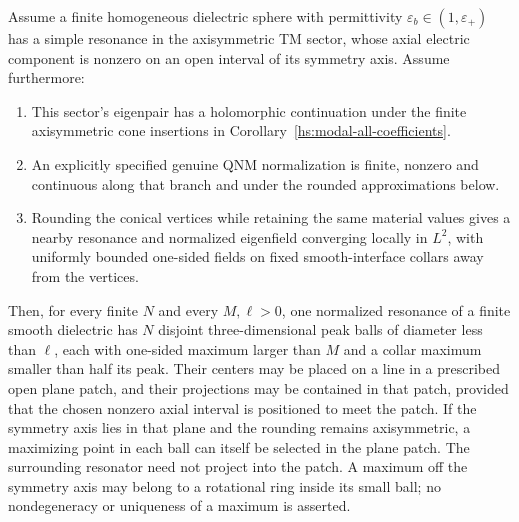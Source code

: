 \begin{proposition}
\label{hs:modal-transfer}
Assume a finite homogeneous dielectric sphere with permittivity
$\varepsilon_b\in(1,\varepsilon_+)$ has a simple resonance in the
axisymmetric TM sector, whose axial electric component is nonzero
on an open interval of its symmetry axis.  Assume furthermore:
\begin{enumerate}
\item This sector's eigenpair has a holomorphic continuation under
the finite axisymmetric cone insertions in
Corollary~\ref{hs:modal-all-coefficients}.
\item An explicitly specified genuine QNM normalization is finite,
nonzero and continuous along that branch and under the rounded
approximations below.
\item Rounding the conical vertices while retaining the same
material values gives a nearby resonance and normalized eigenfield
converging locally in $L^2$, with uniformly bounded one-sided fields
on fixed smooth-interface collars away from the vertices.
\end{enumerate}
Then, for every finite $N$ and every $M,\ell>0$, one normalized
resonance of a finite smooth dielectric has $N$ disjoint
three-dimensional peak balls of diameter less than $\ell$, each
with one-sided maximum larger than $M$ and a collar maximum smaller
than half its peak.  Their centers may be placed on a line in a
prescribed open plane patch, and their projections may be contained
in that patch, provided that the chosen nonzero axial interval is
positioned to meet the patch.  If the symmetry axis lies in that
plane and the rounding remains axisymmetric, a maximizing point
in each ball can itself be selected in the plane patch.  The
surrounding resonator need not project into the patch.  A maximum
off the symmetry axis may belong to a rotational ring inside its
small ball; no nondegeneracy or uniqueness of a maximum is asserted.
\end{proposition}

